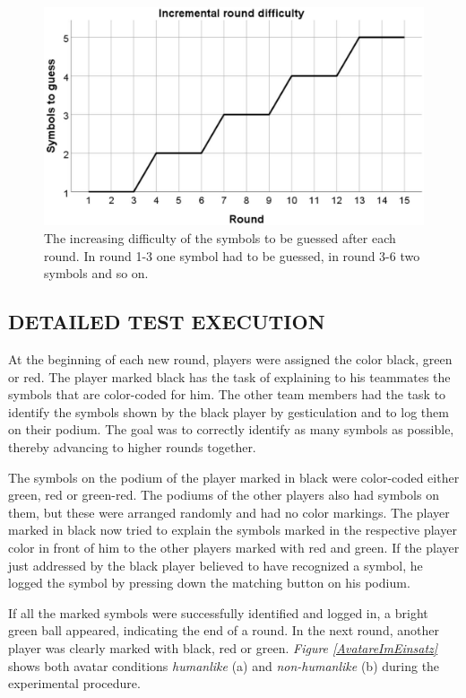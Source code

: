 \documentclass[sigchi]{acmart}
\begin{document}
\begin{figure}[H]
		\begin{footnotesize}
		\centering
			\includegraphics[width=0.9\linewidth]{Abbildungen/RoundDifficulty.JPG}	
			\caption[The difficulty of the rounds]{The increasing difficulty of the symbols to be guessed after each round. In round 1-3 one symbol had to be guessed, in round 3-6 two symbols and so on.}
			\label{RoundDifficulty}
		\end{footnotesize}
	\end{figure}

\subsection{DETAILED TEST EXECUTION}
At the beginning of each new round, players were assigned the color black, green or red.
The player marked black has the task of explaining to his teammates the symbols that are color-coded for him. The other team members had the task to identify the symbols shown by the black player by gesticulation and to log them on their podium. The goal was to correctly identify as many symbols as possible, thereby advancing to higher rounds together.

The symbols on the podium of the player marked in black were color-coded either green, red or green-red. The podiums of the other players also had symbols on them, but these were arranged randomly and had no color markings. The player marked in black now tried to explain the symbols marked in the respective player color in front of him to the other players marked with red and green. If the player just addressed by the black player believed to have recognized a symbol, he logged the symbol by pressing down the matching button on his podium. 

If all the marked symbols were successfully identified and logged in, a bright green ball appeared, indicating the end of a round.
In the next round, another player was clearly marked with black, red or green.
\textit{Figure \ref{AvatareImEinsatz}} shows both avatar conditions \textit{humanlike} (a) and \textit{non-humanlike} (b) during the experimental procedure.
	
\end{document}
